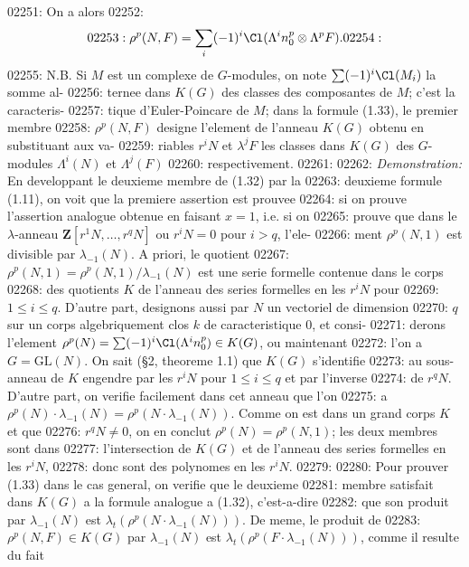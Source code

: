 02251: On a alors
02252: \begin{equation}
02253: \rho^p(N, F) = \sum_i (-1)^i \Cl(\Lambda^i n_0^p \otimes \Lambda^p F).
02254: \end{equation}
02255: N.B. Si $M$ est un complexe de $G$-modules, on note $\sum (-1)^i \Cl(M_i)$ la somme al-
02256: ternee dans $K(G)$ des classes des composantes de $M$; c'est la caracteris-
02257: tique d'Euler-Poincare de $M$; dans la formule (1.33), le premier membre
02258: $\rho^p(N, F)$ designe l'element de l'anneau $K(G)$ obtenu en substituant aux va-
02259: riables $r^i N$ et $\lambda^j F$ les classes dans $K(G)$ des $G$-modules $\Lambda^i(N)$ et $\Lambda^j(F)$
02260: respectivement.
02261: 
02262: \textit{Demonstration:} En developpant le deuxieme membre de (1.32) par la
02263: deuxieme formule (1.11), on voit que la premiere assertion est prouvee
02264: si on prouve l'assertion analogue obtenue en faisant $x = 1$, i.e. si on
02265: prouve que dans le $\lambda$-anneau $\mathbf{Z}[r^1 N, \ldots, r^q N]$ ou $r^i N = 0$ pour $i > q$, l'ele-
02266: ment $\rho^p(N, 1)$ est divisible par $\lambda_{-1}(N)$. A priori, le quotient
02267: $\rho^p(N, 1) = \rho^p(N, 1) / \lambda_{-1}(N)$ est une serie formelle contenue dans le corps
02268: des quotients $K$ de l'anneau des series formelles en les $r^i N$ pour
02269: $1 \leq i \leq q$. D'autre part, designons aussi par $N$ un vectoriel de dimension
02270: $q$ sur un corps algebriquement clos $k$ de caracteristique 0, et consi-
02271: derons l'element $\rho^p(N) = \sum (-1)^i \Cl(\Lambda^i n_0^p) \in K(G)$, ou maintenant
02272: l'on a $G = \mathrm{GL}(N)$. On sait (\S 2, theoreme 1.1) que $K(G)$ s'identifie
02273: au sous-anneau de $K$ engendre par les $r^i N$ pour $1 \leq i \leq q$ et par l'inverse
02274: de $r^q N$. D'autre part, on verifie facilement dans cet anneau que l'on
02275: a $\rho^p(N) \cdot \lambda_{-1}(N) = \rho^p(N \cdot \lambda_{-1}(N))$. Comme on est dans un grand corps $K$ et que
02276: $r^q N \neq 0$, on en conclut $\rho^p(N) = \rho^p(N, 1)$; les deux membres sont dans
02277: l'intersection de $K(G)$ et de l'anneau des series formelles en les $r^i N$,
02278: donc sont des polynomes en les $r^i N$.
02279: 
02280: Pour prouver (1.33) dans le cas general, on verifie que le deuxieme
02281: membre satisfait dans $K(G)$ a la formule analogue a (1.32), c'est-a-dire
02282: que son produit par $\lambda_{-1}(N)$ est $\lambda_t(\rho^p(N \cdot \lambda_{-1}(N)))$. De meme, le produit de
02283: $\rho^p(N, F) \in K(G)$ par $\lambda_{-1}(N)$ est $\lambda_t(\rho^p(F \cdot \lambda_{-1}(N)))$, comme il resulte du fait
